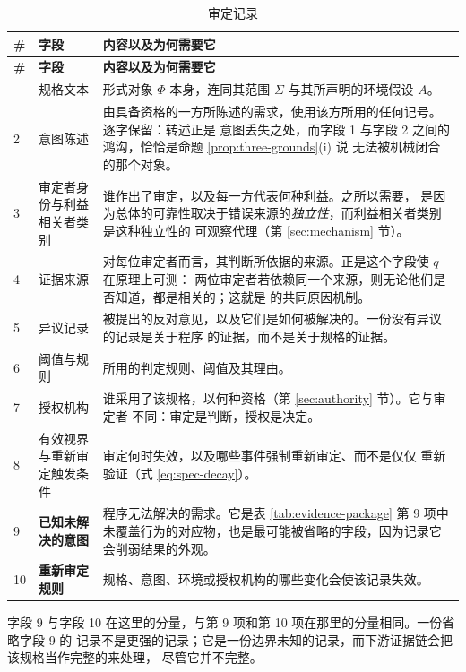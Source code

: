\begin{center}
\small
\begin{longtable}{L{0.9cm}L{5.2cm}L{8.5cm}}
\caption{审定记录}\label{tab:attestation}\\
\toprule
\textbf{\#} & \textbf{字段} & \textbf{内容以及为何需要它} \\
\midrule
\endfirsthead
\toprule
\textbf{\#} & \textbf{字段} & \textbf{内容以及为何需要它} \\
\midrule
\endhead
\bottomrule
{} & 规格文本 & 形式对象 $\Phi$ 本身，连同其范围 $\Sigma$ 与其所声明的环境假设 $A$。 \\
2 & 意图陈述 & 由具备资格的一方所陈述的需求，使用该方所用的任何记号。逐字保留：转述正是
  意图丢失之处，而字段 1 与字段 2 之间的鸿沟，恰恰是命题 \ref{prop:three-grounds}(i) 说
  无法被机械闭合的那个对象。 \\
3 & 审定者身份与利益相关者类别 & 谁作出了审定，以及每一方代表何种利益。之所以需要，
  是因为总体的可靠性取决于错误来源的\emph{独立性}，而利益相关者类别是这种独立性的
  可观察代理（第 \ref{sec:mechanism} 节）。 \\
4 & 证据来源 & 对每位审定者而言，其判断所依据的来源。正是这个字段使 $q$ 在原理上可测：
  两位审定者若依赖同一个来源，则无论他们是否知道，都是相关的；这就是
  \cite{dietrich2004} 的共同原因机制。 \\
5 & 异议记录 & 被提出的反对意见，以及它们是如何被解决的。一份没有异议的记录是关于程序
  的证据，而不是关于规格的证据。 \\
6 & 阈值与规则 & 所用的判定规则、阈值及其理由。 \\
7 & 授权机构 & 谁采用了该规格，以何种资格（第 \ref{sec:authority} 节）。它与审定者
  不同：审定是判断，授权是决定。 \\
8 & 有效视界与重新审定触发条件 & 审定何时失效，以及哪些事件强制重新审定、而不是仅仅
  重新验证（式 \eqref{eq:spec-decay}）。 \\
9 & \textbf{已知未解决的意图} & 程序无法解决的需求。它是表 \ref{tab:evidence-package}
  第 9 项中未覆盖行为的对应物，也是最可能被省略的字段，因为记录它会削弱结果的外观。 \\
10 & \textbf{重新审定规则} & 规格、意图、环境或授权机构的哪些变化会使该记录失效。 \\
\end{longtable}
\end{center}

字段 9 与字段 10 在这里的分量，与第 9 项和第 10 项在那里的分量相同。一份省略字段 9 的
记录不是更强的记录；它是一份边界未知的记录，而下游证据链会把该规格当作完整的来处理，
尽管它并不完整。

